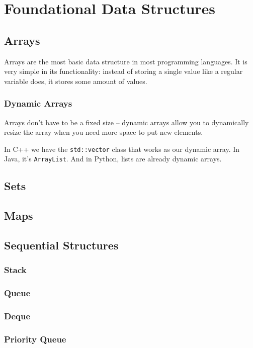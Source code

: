 \section{Foundational Data Structures}
\subsection{Arrays}

Arrays are the most basic data structure in most programming languages. It is very simple in its functionality: instead of storing a single value like a regular variable does, it stores some amount of values.

\subsubsection{Dynamic Arrays}

Arrays don't have to be a fixed size -- dynamic arrays allow you to dynamically resize the array when you need more space to put new elements.

In C++ we have the \texttt{std::vector} class that works as our dynamic array. In Java, it's \texttt{ArrayList}. And in Python, lists are already dynamic arrays.

\subsection{Sets}
\subsection{Maps}
\subsection{Sequential Structures}
\subsubsection{Stack}
\subsubsection{Queue}
\subsubsection{Deque}
\subsubsection{Priority Queue}